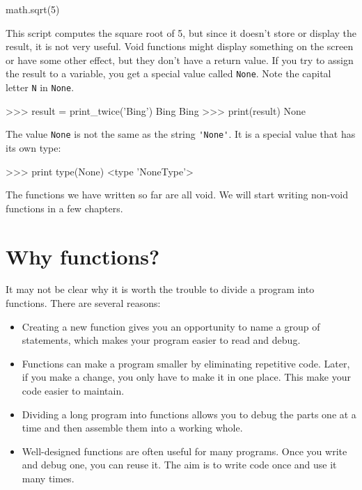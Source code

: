 \beforeverb
\begin{pyinterpreter}
math.sqrt(5)
\end{pyinterpreter}
\afterverb
%
This script computes the square root of 5, but since it doesn't store
or display the result, it is not very useful.
%
%
Void functions might display something on the screen or have some
other effect, but they don't have a return value.  If you try to
assign the result to a variable, you get a special value called
{\tt None}. Note the capital letter {\tt N} in {\tt None}.


\beforeverb
\begin{pyinterpreter}
>>> result = print_twice('Bing')
Bing
Bing
>>> print(result)
None
\end{pyinterpreter}
\afterverb
%
The value {\tt None} is not the same as the string \verb"'None'". 
It is a special value that has its own type:

\beforeverb
\begin{pyinterpreter}
>>> print type(None)
<type 'NoneType'>
\end{pyinterpreter}
\afterverb
%
The functions we have written so far are all void.  We will start
writing non-void functions in a few chapters.


\section{Why functions?}

It may not be clear why it is worth the trouble to divide
a program into functions.  There are several reasons:

\begin{itemize}

\item Creating a new function gives you an opportunity to name a group
of statements, which makes your program easier to read and debug.

\item Functions can make a program smaller by eliminating repetitive
code.  Later, if you make a change, you only have
to make it in one place. This make your code easier to maintain.

\item Dividing a long program into functions allows you to debug the
parts one at a time and then assemble them into a working whole.

\item Well-designed functions are often useful for many programs.
Once you write and debug one, you can reuse it. The aim is to write
 code once and use it many times.

\end{itemize}


